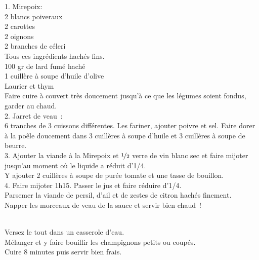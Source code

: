 \begin{minipage}[c]{\textwidth}
1. Mirepoix: \\
2 blancs poiveraux\\
2 carottes \\
2 oignons\\
2 branches de céleri\\
Tous ces ingrédients hachés fins. \\
100 gr de lard fumé haché\\
1 cuillère à soupe d’huile d’olive\\
Laurier et thym\\
Faire cuire à couvert très doucement jusqu’à ce que les légumes soient fondus, garder au chaud. \\
2. Jarret de veau : \\
6 tranches de 3 cuissons différentes. Les fariner, ajouter poivre et sel. Faire dorer à la poêle doucement dans 3 cuillères à soupe d’huile et 3 cuillères à soupe de beurre. \\
3. Ajouter la viande à la Mirepoix et $\nicefrac{1}{2}$ verre de vin blanc sec et faire mijoter jusqu’au moment où le liquide a réduit d’1/4. \\
Y ajouter 2 cuillères à soupe de purée tomate et une tasse de bouillon. \\
4. Faire mijoter 1h15. Passer le jus et faire réduire d’1/4. \\
Parsemer la viande de persil, d’ail et de zestes de citron hachés finement. \\
Napper les morceaux de veau de la sauce et servir bien chaud !\\
\\

\end{minipage}

\begin{minipage}[c]{\textwidth}
Versez le tout dans un casserole d'eau.\\
Mélanger et y faire bouillir les champignons petits ou coupés.\\
Cuire 8 minutes puis servir bien frais.\\
\\

\end{minipage}

